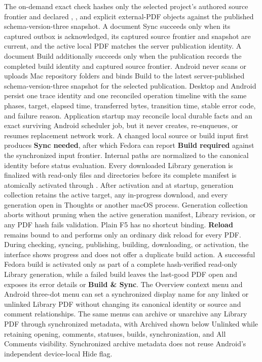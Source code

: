 {The on-demand exact check hashes only the selected project's authored source frontier and declared , , and explicit external-PDF objects against the published schema-version-three snapshot.
A document Sync succeeds only when its captured outbox is acknowledged, its captured source frontier and snapshot are current, and the active local PDF matches the server publication identity.
A document Build additionally succeeds only when the publication records the completed build identity and captured source frontier.
Android never scans or uploads Mac repository folders and binds Build to the latest server-published schema-version-three snapshot for the selected publication.
Desktop and Android persist one trace identity and one reconciled operation timeline with the same phases, target, elapsed time, transferred bytes, transition time, stable error code, and failure reason.
Application startup may reconcile local durable facts and an exact surviving Android scheduler job, but it never creates, re-enqueues, or resumes replacement network work.
A changed local source or build input first produces \textbf{Sync needed}, after which Fedora can report \textbf{Build required} against the synchronized input frontier.
Internal  paths are normalized to the canonical  identity before status evaluation.
Every downloaded Library generation is finalized with read-only files and directories before its complete manifest is atomically activated through .
After activation and at startup, generation collection retains the active target, any in-progress download, and every generation open in Thoughts or another macOS process.
Generation collection aborts without pruning when the active generation manifest, Library revision, or any PDF hash fails validation.
Plain F5 has no shortcut binding.
\textbf{Reload} remains bound to  and performs only an ordinary disk reload for every PDF.
During checking, syncing, publishing, building, downloading, or activation, the interface shows progress and does not offer a duplicate build action.
A successful Fedora build is activated only as part of a complete hash-verified read-only Library generation, while a failed build leaves the last-good PDF open and exposes its error details or \textbf{Build \& Sync}.
The Overview context menu and Android three-dot menu can set a synchronized display name for any linked or unlinked Library PDF without changing its canonical identity or source and comment relationships.
The same menus can archive or unarchive any Library PDF through synchronized metadata, with Archived shown below Unlinked while retaining opening, comments, statuses, builds, synchronization, and All Comments visibility.
Synchronized archive metadata does not reuse Android's independent device-local Hide flag.}

